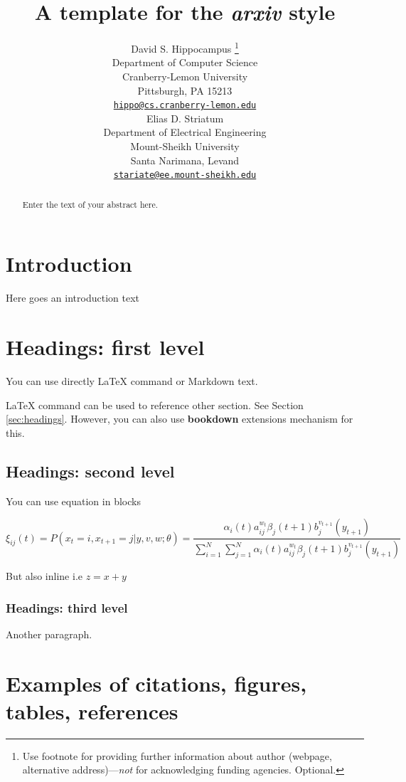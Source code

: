 \documentclass{article}
\title{A template for the \emph{arxiv} style}
\author{
    David S. Hippocampus
    \thanks{Use footnote for providing further information about author
(webpage, alternative address)---\emph{not} for acknowledging funding
agencies. Optional.}
   \\
    Department of Computer Science \\
    Cranberry-Lemon University \\
  Pittsburgh, PA 15213 \\
  \texttt{\href{mailto:hippo@cs.cranberry-lemon.edu}{\nolinkurl{hippo@cs.cranberry-lemon.edu}}} \\
   \And
    Elias D. Striatum
   \\
    Department of Electrical Engineering \\
    Mount-Sheikh University \\
  Santa Narimana, Levand \\
  \texttt{\href{mailto:stariate@ee.mount-sheikh.edu}{\nolinkurl{stariate@ee.mount-sheikh.edu}}} \\
  }
\begin{document}
\maketitle


\begin{abstract}
Enter the text of your abstract here.
\end{abstract}


\section{Introduction}\label{introduction}

Here goes an introduction text

\section{Headings: first level}\label{headings-first-level}

\label{sec:headings}

You can use directly LaTeX command or Markdown text.

LaTeX command can be used to reference other section. See Section
\ref{sec:headings}. However, you can also use \textbf{bookdown}
extensions mechanism for this.

\subsection{Headings: second level}\label{headings-second-level}

You can use equation in blocks

\[
\xi _{ij}(t)=P(x_{t}=i,x_{t+1}=j|y,v,w;\theta)= {\frac {\alpha _{i}(t)a^{w_t}_{ij}\beta _{j}(t+1)b^{v_{t+1}}_{j}(y_{t+1})}{\sum _{i=1}^{N} \sum _{j=1}^{N} \alpha _{i}(t)a^{w_t}_{ij}\beta _{j}(t+1)b^{v_{t+1}}_{j}(y_{t+1})}}
\]

But also inline i.e \(z=x+y\)

\subsubsection{Headings: third level}\label{headings-third-level}

Another paragraph.

\section{Examples of citations, figures, tables,
references}\label{examples-of-citations-figures-tables-references}
\end{document}
